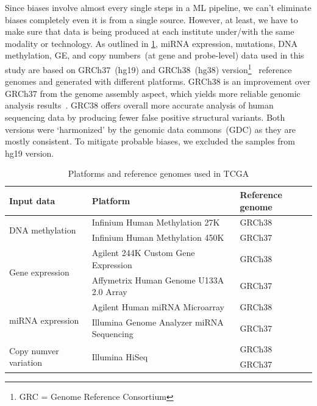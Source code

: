 \hspace*{3.5mm} Since biases involve almost every single steps in a ML pipeline, we can't eliminate biases completely even it is from a single source. However, at least, we have to make sure that data is being produced at each institute under/with the same modality or technology. As outlined in \cref{tab:platforms}, miRNA expression, mutations, DNA methylation, GE, and copy numbers~(at gene and probe-level) data used in this study are based on GRCh37~(hg19) and GRCh38~(hg38) version\footnote{GRC = Genome Reference Consortium}~\cite{gao2019before} reference genomes and generated with different platforms. GRCh38 is an improvement over GRCh37 from the genome assembly aspect, which yields more reliable genomic analysis results~\cite{guo2017improvements}. GRC38 offers overall more accurate analysis of human sequencing data by producing fewer false positive structural variants. Both versions were ‘harmonized’ by the genomic data commons~(GDC) as they are mostly consistent\cite{guo2017improvements}. To mitigate probable biases, we excluded the samples from hg19 version.  

\begin{table}
    \centering
    \scriptsize
    \caption{Platforms and reference genomes used in TCGA}
    \label{tab:platforms}
    \vspace{-2mm}
    \begin{tabular}{l|l|l} 
        \hline
        \textbf{Input data} & \textbf{Platform} & \textbf{Reference genome}  \\ 
        \hline
        \multirow{2}{*}{DNA methylation}  & Infinium Human Methylation 27K & GRCh38  \\ 
        \cline{2-3}
                                               & Infinium Human Methylation 450K & GRCh37 \\ 
        \hline
        \multirow{2}{*}{Gene expression}       & Agilent 244K Custom Gene Expression & GRCh38 \\ 
        \cline{2-3}
                                               & Affymetrix Human Genome U133A 2.0 Array & GRCh37 \\ 
        \hline
        \multirow{2}{*}{miRNA expression}      & Agilent Human miRNA Microarray & GRCh38 \\ 
        \cline{2-3}
                                               & Illumina Genome Analyzer miRNA Sequencing & GRCh37  \\ 
        \hline
        \multirow{2}{*}{Copy numver variation} & \multirow{2}{*}{Illumina HiSeq}           & GRCh38  \\
                                               &                                           & GRCh37 \\ 
        \hline
    \end{tabular}
    \vspace{-2mm}
\end{table}

